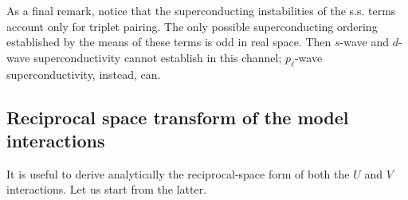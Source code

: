 As a final remark, notice that the superconducting instabilities of the s.s. terms account only for triplet pairing. The only possible superconducting ordering established by the means of these terms is odd in real space. Then $s$-wave and $d$-wave superconductivity cannot establish in this channel; $p_\ell$-wave superconductivity, instead, can.

\subsection{Reciprocal space transform of the model interactions}\label{subsec:mft-discussion-reciprocal-interactions}

It is useful to derive analytically the reciprocal-space form of both the $U$ and $V$ interactions. Let us start from the latter.

